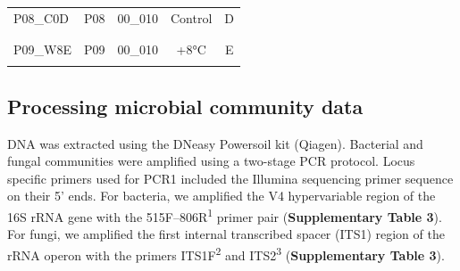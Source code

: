 \documentclass[
  10pt,
  letterpaper,
  DIV=11,
  numbers=noendperiod]{scrartcl}
\begin{document}
\begin{table}[H]
\begin{tabular}[t]{lcccc}
\hspace{1em}P08\_C0D & P08 & 00\_010 & Control & D\\
\addlinespace[-0.3em]
\multicolumn{5}{l}{\textbf{}}\\
\hspace{1em}\cellcolor{gray!6}{P09\_W3E} & \cellcolor{gray!6}{P09} & \cellcolor{gray!6}{00\_010} & \cellcolor{gray!6}{+3°C} & \cellcolor{gray!6}{E}\\
\hspace{1em}P09\_W8E & P09 & 00\_010 & +8°C & E\\
\hspace{1em}\cellcolor{gray!6}{P10\_C0E} & \cellcolor{gray!6}{P10} & \cellcolor{gray!6}{00\_010} & \cellcolor{gray!6}{Control} & \cellcolor{gray!6}{E}\\
\bottomrule
\end{tabular}
\end{table}

\hypertarget{processing-microbial-community-data}{%
\subsection{Processing microbial community
data}\label{processing-microbial-community-data}}

DNA was extracted using the DNeasy Powersoil kit (Qiagen). Bacterial and
fungal communities were amplified using a two-stage PCR protocol. Locus
specific primers used for PCR1 included the Illumina sequencing primer
sequence on their 5' ends. For bacteria, we amplified the V4
hypervariable region of the 16S rRNA gene with the
515F--806R\textsuperscript{1} primer pair (\textbf{Supplementary Table
3}). For fungi, we amplified the first internal transcribed spacer
(ITS1) region of the rRNA operon with the primers
ITS1F\textsuperscript{2} and ITS2\textsuperscript{3}
(\textbf{Supplementary Table 3}).
\end{document}

